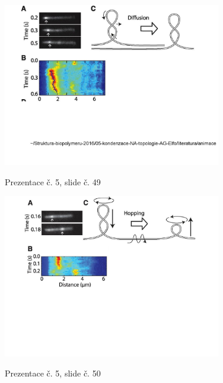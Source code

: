 \documentclass[DIV=8]{scrreprt}
\begin{document}
\begin{figure}
    \caption{Prezentace č. 5, slide č. 49}
    \includegraphics[width=0.85\textwidth]{slides-5/slide-49.jpg}
    \centering
    \label{slides-5-slide-49}
\end{figure}
\begin{figure}
    \caption{Prezentace č. 5, slide č. 50}
    \includegraphics[width=0.85\textwidth]{slides-5/slide-50.jpg}
    \centering
    \label{slides-5-slide-50}
\end{figure}
\end{document}
